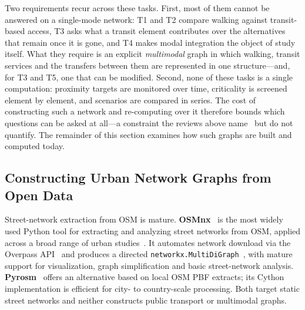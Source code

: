 \documentclass[smartcities,article,submit,moreauthors]{Definitions/mdpi}
\begin{document}
    Two requirements recur across these tasks.
    First, most of them cannot be answered on a single-mode network: T1 and T2 compare walking against
    transit-based access, T3 asks what a transit element contributes over the alternatives that remain
    once it is gone, and T4 makes modal integration the object of study itself.
    What they require is an explicit \emph{multimodal} graph in which walking, transit services and the
    transfers between them are represented in one structure---and, for T3 and T5, one that can be
    modified.
    Second, none of these tasks is a single computation: proximity targets are monitored over time,
    criticality is screened element by element, and scenarios are compared in series.
    The cost of constructing such a network and re-computing over it therefore bounds which questions
    can be asked at all---a constraint the reviews above name~\cite{ladin2025review} but do not
    quantify.
    The remainder of this section examines how such graphs are built and computed today.

    \subsection{Constructing Urban Network Graphs from Open Data}
    \label{subsec:rw-construction}

    Street-network extraction from OSM is mature.
    \textbf{OSMnx}~\cite{boeing2025osmnx} is the most widely used Python tool for extracting and
    analyzing street networks from OSM, applied across a broad range of urban
    studies~\cite{coutrot2022,nilsson2019,feng2020,liao2020}.
    It automates network download via the Overpass API~\cite{overpass_api} and produces a directed
    \texttt{networkx.MultiDiGraph}~\cite{hagberg2008networkx}, with mature support for visualization,
    graph simplification and basic street-network analysis.
    \textbf{Pyrosm}~\cite{pyrosm_docs} offers an alternative based on local OSM PBF extracts; its Cython
    implementation is efficient for city- to country-scale processing.
    Both target static street networks and neither constructs public transport or multimodal graphs.
\end{document}
